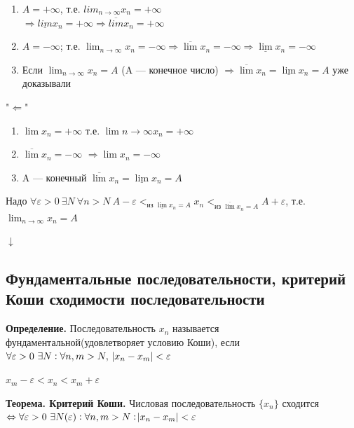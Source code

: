 \documentclass{article}
\begin{document}
    \begin{enumerate}
        \item \( A = +\infty \), т.е. \( lim_{n \rightarrow \infty}x_n = +\infty \)\\
        \( \Rightarrow \underline{lim}x_n = +\infty \Rightarrow \overline{lim}x_n = +\infty \)   
        \item \(A = -\infty\); т.е. \(\lim_{n \rightarrow \infty}{x_n} = -\infty \Rightarrow \overline{\lim}x_n = -\infty \Rightarrow \underline{\lim}x_n = -\infty\)
        \item Если \( \lim_{n \rightarrow \infty}x_n = A \) (A --- конечное число) \( \Rightarrow \overline{\lim}x_n = \underline{\lim}x_n = A \) уже доказывали
    \end{enumerate}

    "\( \Leftarrow \)"
    \begin{enumerate}
        \item \(\lim x_n = +\infty\)
        т.е. \(\lim{n \rightarrow \infty}{x_n} = +\infty\)
        
        \item \( \overline{\lim}x_n = -\infty \)
        \( \Rightarrow \lim x_n = -\infty \)

        \item A --- конечный \(\overline{\lim} x_n = \underline{\lim} x_n = A\)
    \end{enumerate}
    Надо \( \forall \varepsilon > 0\ \exists N\ \forall n > N\ A - \varepsilon <_{\textrm{из } \underline{\lim}x_n = A} x_n <_{\textrm{из } \overline{\lim}x_n = A} A + \varepsilon \), т.е. \( \lim_{n \rightarrow \infty}x_n = A \)
    
    \( \downarrow \)
    
    \subsection{Фундаментальные последовательности, критерий Коши сходимости последовательности}
    
  	\textbf{Определение.} Последовательность \( x_n \) называется фундаментальной(удовлетворяет условию Коши), если \( \forall \varepsilon > 0\ \exists N: \forall n, m > N,\ \abs{x_n - x_m} < \varepsilon \)
    
    \(x_m - \varepsilon < x_n < x_m + \varepsilon\)

    \textbf{Теорема. Критерий Коши.} Числовая последовательность \( \{x_n\} \) сходится \( \Leftrightarrow \forall \varepsilon > 0\ \exists N(\varepsilon): \forall n, m > N: \abs{x_n - x_m} < \varepsilon \) 
\end{document}
